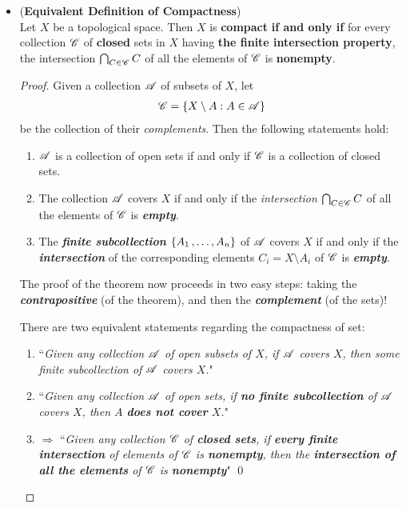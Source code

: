 \documentclass[11pt]{article}
\begin{document}
\begin{itemize}
\item \begin{proposition} (\textbf{Equivalent Definition of Compactness}) \citep{munkres2000topology} \\
Let $X$ be a topological space. Then $X$ is \textbf{compact} \textbf{if and only if} for every collection ${\mathscr C}$ of \textbf{closed} sets in $X$ having \textbf{the finite intersection property}, the intersection $\bigcap_{C\in {\mathscr C}}C$ of all the elements of ${\mathscr C}$ is \textbf{nonempty}.
\end{proposition}
\begin{proof}
Given a collection ${\mathscr A}$ of subsets of $X$, let
\begin{align*}
{\mathscr C} = \left\{X \setminus A:  A \in {\mathscr A}\right\}
\end{align*}
be the collection of their \emph{complements}. Then the following statements hold:
\begin{enumerate}
\item ${\mathscr A}$ is a collection of open sets if and only if ${\mathscr C}$ is a collection of closed sets.
\item The collection ${\mathscr A}$ covers $X$ if and only if the \emph{intersection} $\bigcap_{C \in {\mathscr C}} C$ of all the elements of ${\mathscr C}$ is \emph{\textbf{empty}}.
\item The \emph{\textbf{finite subcollection}} $\{A_1 \,{,}\ldots{,}\, A_n\}$ of ${\mathscr A}$ covers $X$ if and only if the \emph{\textbf{intersection}} of the corresponding elements $C_i = X \setminus A_i$ of ${\mathscr C}$ is \emph{\textbf{empty}}.
\end{enumerate}
The proof of the theorem now proceeds in two easy steps: taking the \emph{\textbf{contrapositive}} (of the theorem), and then the \emph{\textbf{complement}} (of the sets)!

There are two equivalent statements regarding the compactness of set:
\begin{enumerate}
\item ``\emph{Given any collection ${\mathscr A}$ of open subsets of $X$, if ${\mathscr A}$ covers $X$, then some finite subcollection of ${\mathscr A}$ covers $X$.}"
\item ``\emph{Given any collection ${\mathscr A}$ of open sets, if \textbf{no finite subcollection} of ${\mathscr A}$ covers $X$, then $A$ \textbf{does not cover} $X$.}"

\item $\Rightarrow$  ``\emph{Given any collection ${\mathscr C}$ of \textbf{closed sets}, if \textbf{every finite intersection} of elements of ${\mathscr C}$ is \textbf{nonempty}, then the \textbf{intersection of all the elements} of ${\mathscr C}$ is \textbf{nonempty}}" \qed
\end{enumerate}
\end{proof}


\end{itemize}
\end{document}
